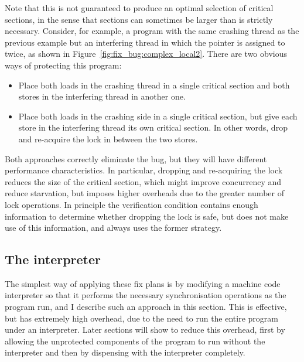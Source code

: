 Note that this is not guaranteed to produce an optimal selection of
critical sections, in the sense that sections can sometimes be larger
than is strictly necessary.  Consider, for example, a program with the
same crashing thread as the previous example but an interfering thread
in which the pointer is assigned to twice, as shown in
Figure~\ref{fig:fix_bug:complex_local2}.  There are two obvious
ways of protecting this program:

\begin{itemize}
\item
  Place both loads in the crashing thread in a single critical section and
  both stores in the interfering thread in another one.
\item
  Place both loads in the crashing side in a single critical section,
  but give each store in the interfering thread its own critical
  section.  In other words, drop and re-acquire the lock in between
  the two stores.
\end{itemize}

Both approaches correctly eliminate the bug, but they will have
different performance characteristics.  In particular, dropping and
re-acquiring the lock reduces the size of the critical section, which
might improve concurrency and reduce starvation, but imposes higher
overheads due to the greater number of lock operations.  In principle
the verification condition contains enough information to determine
whether dropping the lock is safe, but {\technique} does not make use
of this information, and always uses the former strategy.

\subsection{The interpreter}

The simplest way of applying these fix plans is by modifying a machine
code interpreter so that it performs the necessary synchronisation
operations as the program run, and I describe such an approach in this
section.  This is effective, but has extremely high overhead, due to
the need to run the entire program under an interpreter.  Later
sections will show to reduce this overhead, first by allowing the
unprotected components of the program to run without the interpreter
and then by dispensing with the interpreter completely.

